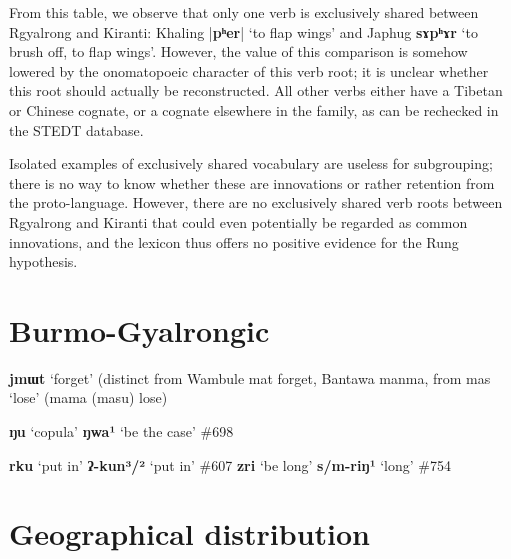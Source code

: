 \documentclass[oldfontcommands,oneside,a4paper,11pt]{article}
\newcommand{\ipa}[1]{{\phon\textbf{#1}}}
\newcommand{\forme}[2]{\ipa{#1} `#2'}
\newcommand{\dhatu}[2]{|\ipa{#1}| `#2'}
\begin{document}
From this table, we observe that only one verb is exclusively shared between Rgyalrong and Kiranti:  Khaling \dhatu{pʰer}{to flap wings} and Japhug \forme{sɤpʰɤr}{to brush off, to flap wings}. However, the value of this comparison is somehow lowered by the onomatopoeic character of this verb root; it is unclear whether this root should actually be reconstructed.  All other verbs either have a Tibetan or Chinese cognate, or a cognate elsewhere in the family, as can be rechecked in the STEDT database.

Isolated examples of exclusively shared vocabulary are useless for subgrouping; there is no way to know whether these are innovations or rather retention from the proto-language. However, there are no exclusively shared verb roots between Rgyalrong and Kiranti that could even potentially be regarded as common innovations, and the lexicon thus offers no positive evidence for the Rung hypothesis.

\section{Burmo-Gyalrongic}

\forme{jmɯt}{forget} (distinct from Wambule mat	forget, Bantawa manma, from mas `lose' (mama (masu)	lose)

\forme{ŋu}{copula} \forme{ŋwa¹}{be the case}  \#698

\forme{rku}{put in} \forme{ʔ-kun³/²}{put in}  \#607
%
\forme{zri}{be long} \forme{s/m-riŋ¹}{long}  \#754
 

\section{Geographical distribution}



\end{document}
